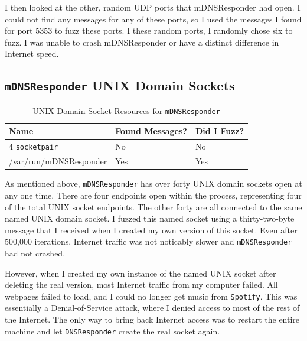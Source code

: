 I then looked at the other, random UDP ports that mDNSResponder had open.  I could not find any messages for any of these ports, so I used the messages I found for port 5353 to fuzz these ports.  I these random ports, I randomly chose six to fuzz.  I was unable to crash mDNSResponder or have a distinct difference in Internet speed.

\subsection{\texttt{mDNSResponder} UNIX Domain Sockets}
\label{sec:mdnsUnix}

\begin{table}
\centering
\begin{normalsize}
\begin{tabular}{ l | l | l }
\textbf{Name} & \textbf{Found Messages?} & \textbf{Did I Fuzz?} \\ \hline
4 \texttt{socketpair} & No & No \\ \hline
/var/run/mDNSResponder & Yes & Yes \\ \hline
\end{tabular}
\caption{UNIX Domain Socket Resources for \texttt{mDNSResponder}}
\label{tab:mdnsTcp}
\end{normalsize}
\end{table} 

As mentioned above, \texttt{mDNSResponder} has over forty UNIX domain sockets open at any one time.  There are four endpoints open within the process, representing four of the total UNIX socket endpoints.  The other forty are all connected to the same named UNIX domain socket.  I fuzzed this named socket using a thirty-two-byte message that I received when I created my own version of this socket.  Even after 500,000 iterations, Internet traffic was not noticably slower and \texttt{mDNSResponder} had not crashed.

However, when I created my own instance of the named UNIX socket after deleting the real version, most Internet traffic from my computer failed.  All webpages failed to load, and I could no longer get music from \texttt{Spotify}.  This was essentially a Denial-of-Service attack, where I denied access to most of the rest of the Internet.  The only way to bring back Internet access was to restart the entire machine and let \texttt{DNSResponder} create the real socket again.

